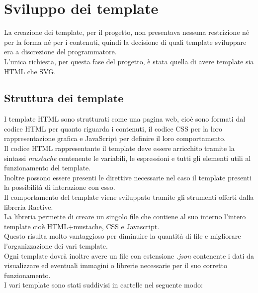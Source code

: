 \section{Sviluppo dei template}
La creazione dei template, per il progetto, non presentava nessuna restrizione né per la forma né per i contenuti, quindi la decisione di quali template sviluppare era a discrezione del programmatore.\\
L'unica richiesta, per questa fase del progetto, è stata quella di avere template sia HTML che SVG.\\
\subsection{Struttura dei template} \label{sec:sviluppo_template}
I template HTML sono strutturati come una pagina web, cioè sono formati dal codice HTML per quanto riguarda i contenuti, il codice CSS per la loro rappresentazione grafica e JavaScript per definire il loro comportamento.\\
Il codice HTML rappresentante il template deve essere arricchito tramite la sintassi \textit{mustache} contenente le variabili, le espressioni e tutti gli elementi utili al funzionamento del template.\\
Inoltre possono essere presenti le direttive necessarie nel caso il template presenti la possibilità di interazione con esso.\\
Il comportamento del template viene sviluppato tramite gli strumenti offerti dalla libreria Ractive.\\
La libreria permette di creare un singolo file che contiene al suo interno l'intero template cioè HTML+mustache, CSS e Javascript.\\
Questo risulta molto vantaggioso per diminuire la quantità di file e migliorare l'organizzazione dei vari template.\\
Ogni template dovrà inoltre avere un file con estensione \textit{.json} contenente i dati da visualizzare ed eventuali immagini o librerie necessarie per il suo corretto funzionamento.\\
I vari template sono stati suddivisi in cartelle nel seguente modo:
